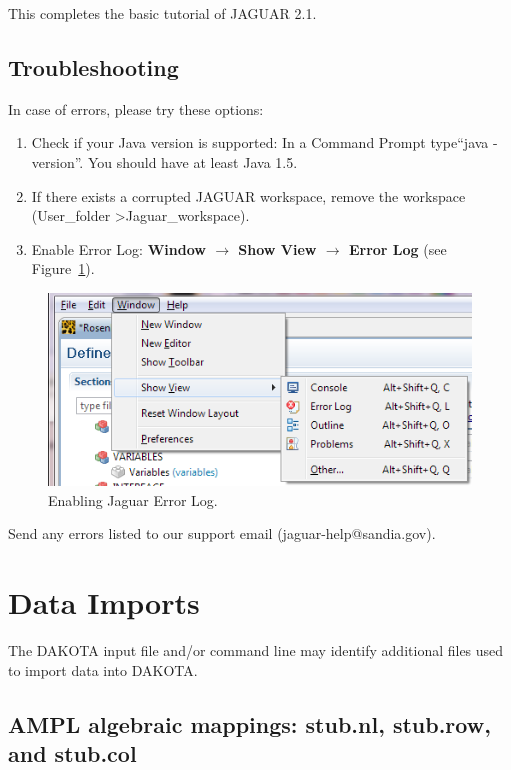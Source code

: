 This completes the basic tutorial of JAGUAR 2.1.

\subsection{Troubleshooting}

In case of errors, please try these options:
\begin{enumerate}
\item  Check if your Java version is supported: In a Command Prompt type``java -version''. You should have at least Java 1.5.
\item  If there exists a corrupted JAGUAR workspace, remove the workspace (User\_folder \textgreater Jaguar\_workspace).
\item  Enable Error Log: {\bf Window $\rightarrow$ Show View $\rightarrow$ Error Log} (see Figure~\ref{fig:input:11ShowView}).
\end{enumerate}

\begin{figure}[htbp]
  \centering
  \includegraphics[scale=0.6]{images/11ShowView}
  \caption{Enabling Jaguar Error Log.}
  \label{fig:input:11ShowView}
\end{figure}


Send any errors listed to our support email (jaguar-help@sandia.gov).

\section{Data Imports}\label{input:import}

The DAKOTA input file and/or command line may identify additional
files used to import data into DAKOTA.

\subsection{AMPL algebraic mappings: stub.nl, stub.row, and stub.col}

